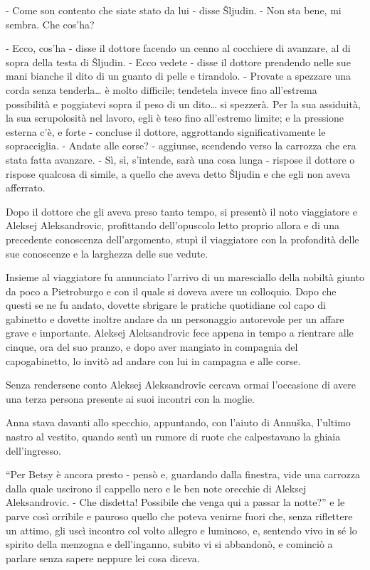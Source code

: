 - Come son contento che siate stato da lui - disse Šljudin. - Non sta bene, mi sembra. Che cos'ha? 

- Ecco, cos'ha - disse il dottore facendo un cenno al cocchiere di avanzare, al di sopra della testa di Šljudin. - Ecco vedete - disse il dottore prendendo nelle sue mani bianche il dito di un guanto di pelle e tirandolo. - Provate a spezzare una corda senza tenderla\ldots{} è molto difficile; tendetela invece fino all'estrema possibilità e poggiatevi sopra il peso di un dito\ldots{} si spezzerà. Per la sua assiduità, la sua scrupolosità nel lavoro, egli è teso fino all'estremo limite; e la pressione esterna c'è, e forte - concluse il dottore, aggrottando significativamente le sopracciglia. - Andate alle corse? - aggiunse, scendendo verso la carrozza che era stata fatta avanzare. - Sì, sì, s'intende, sarà una cosa lunga - rispose il dottore o rispose qualcosa di simile, a quello che aveva detto Šljudin e che egli non aveva afferrato. 

Dopo il dottore che gli aveva preso tanto tempo, si presentò il noto viaggiatore e Aleksej Aleksandrovic, profittando dell'opuscolo letto proprio allora e di una precedente conoscenza dell'argomento, stupì il viaggiatore con la profondità delle sue conoscenze e la larghezza delle sue vedute. 

Insieme al viaggiatore fu annunciato l'arrivo di un maresciallo della nobiltà giunto da poco a Pietroburgo e con il quale si doveva avere un colloquio. Dopo che questi se ne fu andato, dovette sbrigare le pratiche quotidiane col capo di gabinetto e dovette inoltre andare da un personaggio autorevole per un affare grave e importante. Aleksej Aleksandrovic fece appena in tempo a rientrare alle cinque, ora del suo pranzo, e dopo aver mangiato in compagnia del capogabinetto, lo invitò ad andare con lui in campagna e alle corse. 

Senza rendersene conto Aleksej Aleksandrovic cercava ormai l'occasione di avere una terza persona presente ai suoi incontri con la moglie. 

\label{xxvii-1} 

Anna stava davanti allo specchio, appuntando, con l'aiuto di Annuška, l'ultimo nastro al vestito, quando sentì un rumore di ruote che calpestavano la ghiaia dell'ingresso. 

``Per Betsy è ancora presto - pensò e, guardando dalla finestra, vide una carrozza dalla quale uscirono il cappello nero e le ben note orecchie di Aleksej Aleksandrovic. - Che disdetta! Possibile che venga qui a passar la notte?'' e le parve così orribile e pauroso quello che poteva venirne fuori che, senza riflettere un attimo, gli uscì incontro col volto allegro e luminoso, e, sentendo vivo in sé lo spirito della menzogna e dell'inganno, subito vi si abbandonò, e cominciò a parlare senza sapere neppure lei cosa diceva. 

